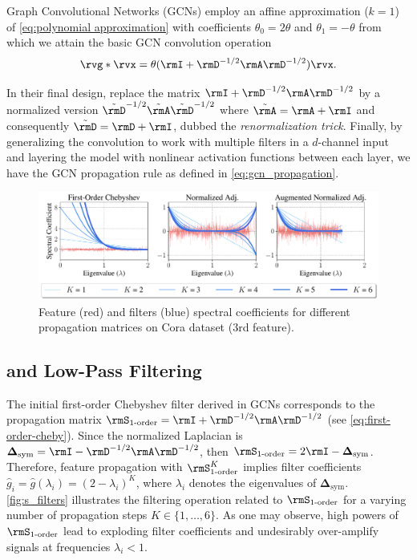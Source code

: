 Graph Convolutional Networks (GCNs) \cite{gcn} employ an affine approximation ($k=1$) of \autoref{eq:polynomial approximation} with coefficients $\theta_0=2\theta$ and $\theta_1=-\theta$ from which we attain the basic GCN convolution operation
\begin{equation} \label{eq:first-order-cheby}
    \rvg * \rvx = \theta (\rmI + \rmD^{-1/2} \rmA \rmD^{-1/2}) \rvx.
\end{equation}

In their final design, \citet{gcn} replace the matrix $\rmI + \rmD^{-1/2} \rmA \rmD^{-1/2}$ by a normalized version $\tilde{\rmD}^{-1/2} \tilde{\rmA} \tilde{\rmD}^{-1/2}$ where $\tilde{\rmA} = \rmA + \rmI$ and consequently $\tilde{\rmD} = \rmD + \rmI$, dubbed the \textit{renormalization trick}. Finally, by generalizing the convolution to work with multiple filters in a $d$-channel input and layering the model with nonlinear activation functions between each layer, we have the GCN propagation rule as defined in \autoref{eq:gcn_propagation}.

\begin{figure}[tb] 
\centering
\includegraphics[width=.8\linewidth]{figures/s_filters_new2.pdf}
\caption{Feature ({\color{myred}red}) and filters ({\color{myblue}blue}) spectral coefficients for different propagation matrices on Cora dataset ($3$rd feature).}
\label{fig:s_filters}
\end{figure}

\subsection{\method{} and Low-Pass Filtering}
The initial first-order Chebyshev filter derived in GCNs corresponds to the propagation matrix $\rmS_{\text{1-order}} = \rmI + \rmD^{-1/2} \rmA \rmD^{-1/2}$ (see \autoref{eq:first-order-cheby}). Since the normalized Laplacian is $\boldsymbol{\Delta}_{\text{sym}} = \rmI - \rmD^{-1/2} \rmA \rmD^{-1/2}$, then $\rmS_{\text{1-order}} = 2\rmI - \boldsymbol{\Delta}_{\text{sym}}$. Therefore, feature propagation with $\rmS_{\text{1-order}}^K$ implies filter coefficients $\hat{g}_i = \hat{g}(\lambda_i) = (2 - \lambda_i)^K$, where $\lambda_i$ denotes the eigenvalues of $\boldsymbol{\Delta}_{\text{sym}}$. \autoref{fig:s_filters} illustrates the filtering operation related to $\rmS_{\text{1-order}}$ for a varying number of propagation steps $K \in \{1,\dots, 6\}$. As one may observe, high powers of $\rmS_{\text{1-order}}$ lead to exploding filter coefficients and undesirably over-amplify signals at frequencies $\lambda_i < 1$.


